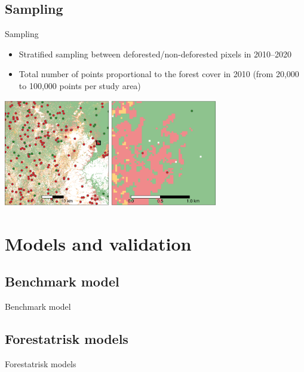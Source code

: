 \documentclass[10pt,table,dvipsnames,compress]{beamer}
\begin{document}
\subsection{Sampling}
\label{sec:org28b713c}

\begin{frame}[label={sec:orgb2dd237}]{Sampling}
\begin{itemize}
\item Stratified sampling between deforested/non-deforested pixels in
2010--2020
\item Total number of points proportional to the forest cover in 2010 (from
20,000 to 100,000 points per study area)
\end{itemize}

\begin{center}
\includegraphics[width=0.7\textwidth]{figs/sm/sample.png}
\end{center}
\end{frame}

\section{Models and validation}
\label{sec:org35f1d54}

\subsection{Benchmark model}
\label{sec:org24b7bb0}

\begin{frame}[label={sec:orgaf18810}]{Benchmark model}
\end{frame}

\subsection{Forestatrisk models}
\label{sec:org21a965e}

\begin{frame}[label={sec:orgfd062d7}]{Forestatrisk models}
\end{frame}
\end{document}

